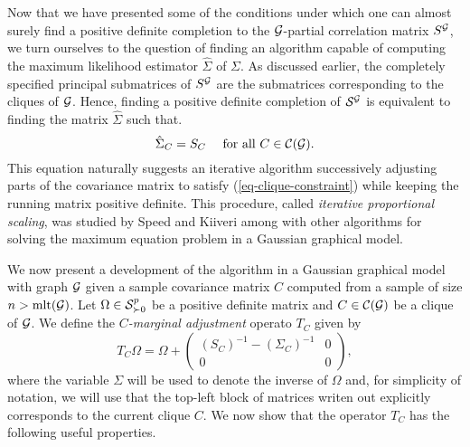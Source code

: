Now that we have presented some of the conditions under which one can almost surely find a positive definite completion to the $\G$-partial correlation matrix $S^\G$, we turn ourselves to the question of finding an algorithm capable of computing the maximum likelihood estimator $\hat\Sigma$ of $\Sigma$. As discussed earlier, the completely specified principal submatrices of $S^\G$ are the submatrices corresponding to the cliques of $\G$. Hence, finding a positive definite completion of $\S^\G$ is equivalent to finding the matrix $\hat\Sigma$ such that.
\begin{equation} \label{eq-clique-constraint}
    \hat\Sigma_C = S_C \ \ \ \ \t{for all } C \in \c{C}(\G).
\end{equation}
This equation naturally suggests an iterative algorithm successively adjusting parts of the covariance matrix to satisfy (\ref{eq-clique-constraint}) while keeping the running matrix positive definite. This procedure, called \textit{iterative proportional scaling}, was studied by Speed and Kiiveri \cite{speed1986gaussian} among with other algorithms for solving the maximum equation problem in a Gaussian graphical model. 

We now present a development of the algorithm in a Gaussian graphical model with graph $\G$ given a sample covariance matrix $C$ computed from a sample of size $n > \t{mlt}(\G)$. Let $\Omega \in \S^p_{\succ 0}$ be a positive definite matrix and $C \in \c{C}(\G)$ be a clique of $\G$. We define the \textit{$C$-marginal adjustment} operato $T_C$ given by
\begin{equation} \label{eq-tc-1}
    T_C \Omega = \Omega + \begin{pmatrix}
        (S_C)^{-1} - (\Sigma_C)^{-1} & 0\\
        0 & 0 
        \end{pmatrix},
\end{equation}
where the variable $\Sigma$ will be used to denote the inverse of $\Omega$ and, for simplicity of notation, we will use that the top-left block of matrices writen out explicitly corresponds to the current clique $C$. We now show that the operator $T_C$ has the following useful properties.

